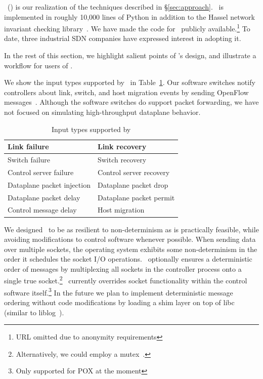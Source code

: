 \projectname~(\projectmeaning) is our realization of the techniques described in
\S\ref{sec:approach}. \projectname~is implemented in roughly 10,000 lines of Python in
addition to the Hassel network invariant checking library~\cite{hsa}. We have
made the code
for \projectname~publicly available.\footnote{URL omitted due to anonymity requirements}
To date, three industrial SDN companies have expressed interest in adopting it.

In the rest of this section, we highlight salient points of \projectname's
design, and illustrate a workflow for users of \projectname.

We show the input types supported by \projectname~in Table~\ref{tab:inputs}.
Our software switches notify controllers about link, switch, and host migration events
by sending OpenFlow messages~\cite{openflow}.
Although the software switches do support packet forwarding, we
have not focused on simulating high-throughput dataplane behavior.

\begin{table}
\centering
\begin{tabular}{|l|l|}
\hline
Link failure & Link recovery \\
\hline
Switch failure & Switch recovery \\
\hline
Control server failure & Control server recovery \\
\hline
Dataplane packet injection & Dataplane packet drop \\
\hline
Dataplane packet delay & Dataplane packet permit \\
\hline
Control message delay & Host migration \\
\hline
\end{tabular}
\caption{Input types supported by \projectname}
\label{tab:inputs}
\end{table}

We designed \projectname~to be as resilient to non-determinism as is
practically feasible, while avoiding modifications to control software whenever possible.
When sending data over multiple sockets, the operating system exhibits some
non-determinism in the order it schedules the socket I/O operations.
\projectname~optionally ensures a deterministic order of messages
by multiplexing all sockets in the controller process
onto a single true socket.\footnote{Alternatively, we could employ a
mutex~\cite{lin2009towards}.}
\projectname~currently overrides socket functionality within the control
software itself.\footnote{Only supported for POX at the moment}
In the future we plan to implement deterministic message ordering without code modifications by
loading a shim layer on top of
libc (similar to liblog~\cite{Geels:2006:RDD:1267359.1267386}).

